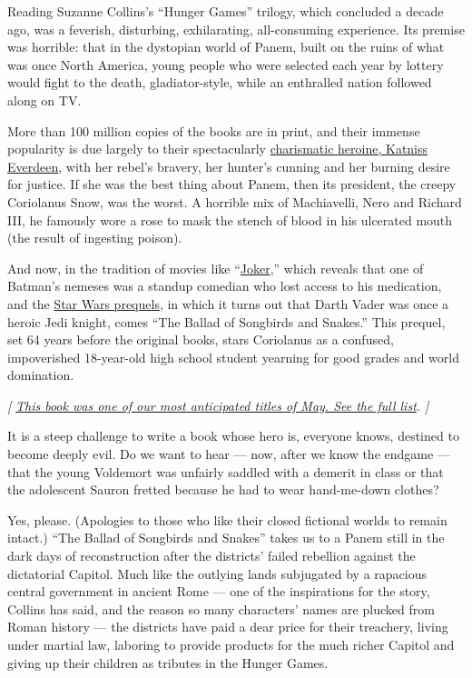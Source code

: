 Reading Suzanne Collins's ``Hunger Games'' trilogy, which concluded a
decade ago, was a feverish, disturbing, exhilarating, all-consuming
experience. Its premise was horrible: that in the dystopian world of
Panem, built on the ruins of what was once North America, young people
who were selected each year by lottery would fight to the death,
gladiator-style, while an enthralled nation followed along on TV.

More than 100 million copies of the books are in print, and their
immense popularity is due largely to their spectacularly
\href{https://www.nytimes.com/2018/10/18/books/katniss-everdeen-hunger-games.html}{charismatic
heroine, Katniss Everdeen}, with her rebel's bravery, her hunter's
cunning and her burning desire for justice. If she was the best thing
about Panem, then its president, the creepy Coriolanus Snow, was the
worst. A horrible mix of Machiavelli, Nero and Richard III, he famously
wore a rose to mask the stench of blood in his ulcerated mouth (the
result of ingesting poison).

And now, in the tradition of movies like
``\href{https://www.nytimes.com/2019/10/03/movies/joker-review.html}{Joker},''
which reveals that one of Batman's nemeses was a standup comedian who
lost access to his medication, and the
\href{https://www.nytimes.com/2019/05/17/movies/star-wars-phantom-menace-anniversary.html}{Star
Wars prequels}, in which it turns out that Darth Vader was once a heroic
Jedi knight, comes ``The Ballad of Songbirds and Snakes.'' This prequel,
set 64 years before the original books, stars Coriolanus as a confused,
impoverished 18-year-old high school student yearning for good grades
and world domination.

\emph{{[}}
\href{https://www.nytimes.com/2020/04/23/arts/new-may-books.html}{\emph{This
book was one of our most anticipated titles of May. See the full
list}}\emph{. {]}}

It is a steep challenge to write a book whose hero is, everyone knows,
destined to become deeply evil. Do we want to hear --- now, after we
know the endgame --- that the young Voldemort was unfairly saddled with
a demerit in class or that the adolescent Sauron fretted because he had
to wear hand-me-down clothes?

Yes, please. (Apologies to those who like their closed fictional worlds
to remain intact.) ``The Ballad of Songbirds and Snakes'' takes us to a
Panem still in the dark days of reconstruction after the districts'
failed rebellion against the dictatorial Capitol. Much like the outlying
lands subjugated by a rapacious central government in ancient Rome ---
one of the inspirations for the story, Collins has said, and the reason
so many characters' names are plucked from Roman history --- the
districts have paid a dear price for their treachery, living under
martial law, laboring to provide products for the much richer Capitol
and giving up their children as tributes in the Hunger Games.


